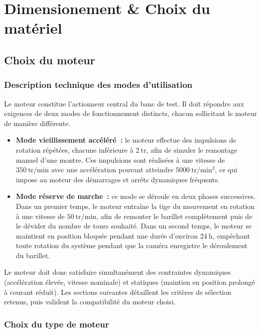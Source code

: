 \chapter{Dimensionement \& Choix du matériel}


\section{Choix du moteur}
\subsection{Description technique des modes d'utilisation}
Le moteur constitue l'actionneur central du banc de test. Il doit
répondre aux exigences de deux modes de fonctionnement distincts, chacun
sollicitant le moteur de manière différente.

\begin{itemize}
    \item \textbf{Mode vieillissement accéléré~:} le moteur effectue des
        impulsions de rotation répétées, chacune inférieure à $2\ \mathrm{tr}$,
        afin de simuler le remontage manuel d'une montre. Ces impulsions sont
        réalisées à une vitesse de $350\ \mathrm{tr/min}$ avec une accélération
        pouvant atteindre $5000\ \mathrm{tr/min^2}$, ce qui impose au moteur
        des démarrages et arrêts dynamiques fréquents.

    \item \textbf{Mode réserve de marche~:} ce mode se déroule en deux phases
        successives. Dans un premier temps, le moteur entraîne la tige du
        mouvement en rotation à une vitesse de $50\ \mathrm{tr/min}$, afin de
        remonter le barillet complètement puis de le dévider du nombre de tours
        souhaité. Dans un second temps, le moteur se maintient en position
        bloquée pendant une durée d'environ $24\ \mathrm{h}$, empêchant toute
        rotation du système pendant que la caméra enregistre le déroulement du
        barillet.
\end{itemize}

Le moteur doit donc satisfaire simultanément des contraintes dynamiques
(accélération élevée, vitesse nominale) et statiques (maintien en position
prolongé à courant réduit). Les sections suivantes détaillent les critères
de sélection retenus, puis valident la compatibilité du moteur choisi.

\newpage
\subsection{Choix du type de moteur}

